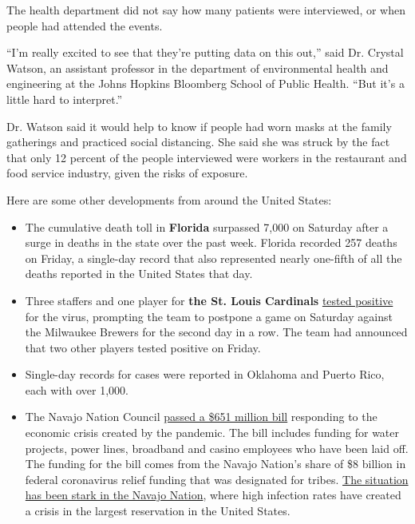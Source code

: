 The health department did not say how many patients were interviewed, or
when people had attended the events.

``I'm really excited to see that they're putting data on this out,''
said Dr. Crystal Watson, an assistant professor in the department of
environmental health and engineering at the Johns Hopkins Bloomberg
School of Public Health. ``But it's a little hard to interpret.''

Dr. Watson said it would help to know if people had worn masks at the
family gatherings and practiced social distancing. She said she was
struck by the fact that only 12 percent of the people interviewed were
workers in the restaurant and food service industry, given the risks of
exposure.

Here are some other developments from around the United States:

\begin{itemize}
\item
  The cumulative death toll in \textbf{Florida} surpassed 7,000 on
  Saturday after a surge in deaths in the state over the past week.
  Florida recorded 257 deaths on Friday, a single-day record that also
  represented nearly one-fifth of all the deaths reported in the United
  States that day.
\item
  Three staffers and one player for \textbf{the St. Louis Cardinals}
  \href{https://www.nytimes.com/2020/08/01/sports/baseball/coronavirus-cardinals.html}{tested
  positive} for the virus, prompting the team to postpone a game on
  Saturday against the Milwaukee Brewers for the second day in a row.
  The team had announced that two other players tested positive on
  Friday.
\item
  Single-day records for cases were reported in Oklahoma and Puerto
  Rico, each with over 1,000.
\item
  The Navajo Nation Council
  \href{https://apnews.com/d8322c62b4f30f5c92ad234bb1f575e0https://apnews.com/d8322c62b4f30f5c92ad234bb1f575e0}{passed
  a \$651 million bill} responding to the economic crisis created by the
  pandemic. The bill includes funding for water projects, power lines,
  broadband and casino employees who have been laid off. The funding for
  the bill comes from the Navajo Nation's share of \$8 billion in
  federal coronavirus relief funding that was designated for tribes.
  \href{https://www.nytimes.com/2020/04/09/us/coronavirus-navajo-nation.html}{The
  situation has been stark in the Navajo Nation}, where high infection
  rates have created a crisis in the largest reservation in the United
  States.
\end{itemize}


